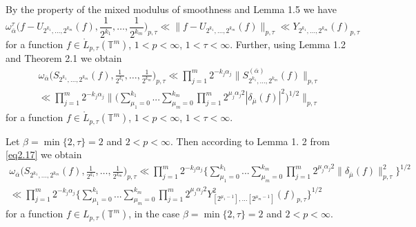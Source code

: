 \documentclass[12pt]{article}
\theoremstyle{plain}
\begin{document}
By the property of the mixed modulus of smoothness and Lemma 1.5 we have
 \begin{equation}\label{eq2.16}
\omega_{\overline\alpha}^{\tau}\bigl(f-U_{2^{k_{1}},...,2^{k_{m}}} (f), \frac{1}{2^{k_{1}}},\ldots , \frac{1}{2^{k_{m}}}\bigr)_{p, \tau}\ll \|f-U_{2^{k_{1}},...,2^{k_{m}}} (f)\|_{p, \tau}\ll Y_{2^{k_{1}},...,2^{k_{m}}}(f)_{p, \tau}
\end{equation}
for a function 
  $f\in {\mathring L}_{p, \tau}(\mathbb{T}^{m})$, $1< p<\infty$, $1< \tau < \infty$.
Further, using Lemma 1.2 and Theorem 2.1 \cite{2} we obtain 
 \begin{multline}\label{eq2.17}
\omega_{\overline\alpha}\bigl(S_{2^{k_{1}},...,2^{k_{m}}}(f), \frac{1}{2^{k_{1}}},\ldots , \frac{1}{2^{k_{m}}}\bigr)_{p, \tau}\ll \prod_{j=1}^{m}2^{-k_{j}\alpha_{j}}\|S_{2^{k_{1}},...,2^{k_{m}}}^{(\overline{\alpha})}(f)\|_{p, \tau}
\\
\ll\prod_{j=1}^{m}2^{-k_{j}\alpha_{j}} \Biggl\|\Biggl(\sum\limits_{\mu_{1}=0}^{k_{1}}...\sum\limits_{\mu_{m}=0}^{k_{m}}\prod_{j=1}^{m}2^{\mu_{j}\alpha_{j}2}|\delta_{\overline{\mu}}(f)|^{2}\Biggr)^{1/2} \Biggr\|_{p, \tau}
\end{multline}
for a function $f\in {\mathring L}_{p, \tau}(\mathbb{T}^{m})$, $1< p<\infty$, $1< \tau < \infty$.

Let $\beta = \min\{2, \tau\}=2$ and $2< p< \infty$. Then according to Lemma 1. 2 \cite{2} from \eqref{eq2.17} we obtain
\begin{multline}\label{eq2.18}
\omega_{\overline\alpha}\bigl(S_{2^{k_{1}},...,2^{k_{m}}}(f), \frac{1}{2^{k_{1}}},\ldots , \frac{1}{2^{k_{m}}}\bigr)_{p, \tau}  \ll \prod_{j=1}^{m}2^{-k_{j}\alpha_{j}}\Biggl\{\sum\limits_{\mu_{1}=0}^{k_{1}}...\sum\limits_{\mu_{m}=0}^{k_{m}} \prod_{j=1}^{m}2^{\mu_{j}\alpha_{j}2}\|\delta_{\overline{\mu}}(f)\|_{p, \tau}^{2} \Biggr\}^{1/2}
\\
 \ll \prod_{j=1}^{m}2^{-k_{j}\alpha_{j}}\Biggl\{\sum\limits_{\mu_{1}=0}^{k_{1}}...\sum\limits_{\mu_{m}=0}^{k_{m}}\prod_{j=1}^{m}2^{\mu_{j}\alpha_{j}2} Y_{[2^{\mu_{1}-1}],... [2^{\mu_{m}-1}]}^{2}(f)_{p, \tau} \Biggr\}^{1/2}
\end{multline}
for a function  
$f\in L_{p, \tau}(\mathbb{T}^{m})$, 
in the case $\beta = \min\{2, \tau\}=2$ and $2< p< \infty$.
\end{document}
